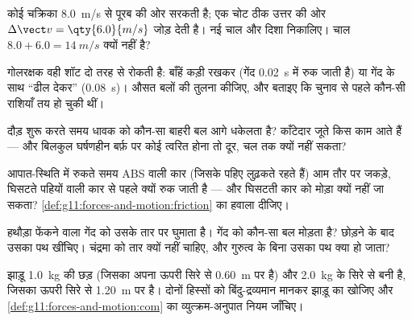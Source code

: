 \begin{exercise}[$\star\star$]\label{exo:g11:forces-and-motion:7}
कोई चक्रिका \qty{8.0}{m/s} से पूरब की ओर सरकती है; एक चोट ठीक उत्तर की ओर $\Delta \vect v = \qty{6.0}{m/s}$
जोड़ देती है। नई चाल और दिशा निकालिए। चाल $8.0 + 6.0 = \qty{14}{m/s}$ क्यों नहीं है?
\end{exercise}

\begin{exercise}[$\star\star$]\label{exo:g11:forces-and-motion:8}
गोलरक्षक वही शॉट दो तरह से रोकती है: बाँहें कड़ी रखकर (गेंद \qty{0.02}{s} में रुक
जाती है) या गेंद के साथ ``ढील देकर'' (\qty{0.08}{s})। औसत बलों की तुलना
कीजिए, और बताइए कि चुनाव से पहले कौन-सी राशियाँ तय हो चुकी थीं।
\end{exercise}

\begin{exercise}[$\star\star$]\label{exo:g11:forces-and-motion:9}
दौड़ शुरू करते समय धावक को कौन-सा बाहरी बल आगे धकेलता है? काँटेदार
जूते किस काम आते हैं --- और बिलकुल घर्षणहीन बर्फ़ पर कोई त्वरित होना तो दूर,
चल तक क्यों नहीं सकता?
\end{exercise}

\begin{exercise}[$\star\star$]\label{exo:g11:forces-and-motion:10}
आपात-स्थिति में रुकते समय ABS वाली कार (जिसके पहिए लुढ़कते रहते हैं) आम तौर
पर जकड़े, घिसटते पहियों वाली कार से पहले क्यों रुक जाती है --- और घिसटती कार
को मोड़ा क्यों नहीं जा सकता? \cref{def:g11:forces-and-motion:friction} का हवाला दीजिए।
\end{exercise}

\begin{exercise}[$\star\star$]\label{exo:g11:forces-and-motion:11}
हथौड़ा फेंकने वाला गेंद को उसके तार पर घुमाता है। गेंद को कौन-सा बल
मोड़ता है? छोड़ने के बाद उसका पथ खींचिए। चंद्रमा को तार क्यों नहीं चाहिए, और
गुरुत्व के बिना उसका पथ क्या हो जाता?
\end{exercise}

\begin{exercise}[$\star\star\star$]\label{exo:g11:forces-and-motion:12}
झाड़ू \qty{1.0}{kg} की  छड़ (जिसका अपना  ऊपरी सिरे
से \qty{0.60}{m} पर है) और \qty{2.0}{kg} के सिरे से बनी है, जिसका  ऊपरी सिरे से \qty{1.20}{m} पर है। दोनों हिस्सों को बिंदु-द्रव्यमान मानकर
झाड़ू का  खोजिए और \cref{def:g11:forces-and-motion:com} का व्युत्क्रम-अनुपात
नियम जाँचिए।
\end{exercise}

